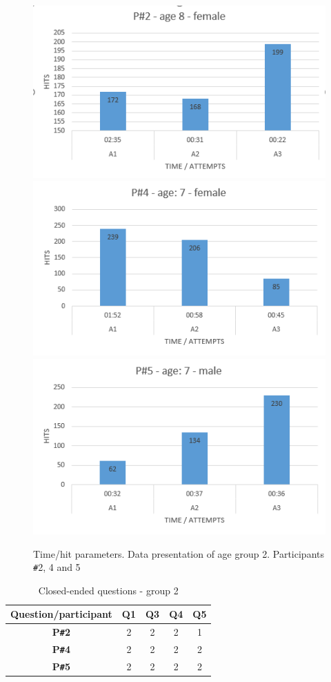 \begin{figure}[!ht]
    \centering
    \includegraphics[width=.6\textwidth]{figures/p2.png}
    \includegraphics[width=.6\textwidth]{figures/p4.png}
        \includegraphics[width=.6\textwidth]{figures/p5.png}
    \caption{Time/hit parameters. Data presentation of age group 2. Participants \texttt{\#}2, 4 and 5}
    \label{fig:agegroup2}
\end{figure}

\begin{table}[!ht]
    \centering
    \begin{tabular}{c|c|c|c|c}
    \hline
    \multicolumn{1}{|c|}{\textbf{Question/participant}} &
    \multicolumn{1}{c|}{\textbf{Q1}} &
    \multicolumn{1}{c|}{\textbf{Q3}} &
    \multicolumn{1}{c|}{\textbf{Q4}} &
    \multicolumn{1}{c|}{\textbf{Q5}} \\ \hline
    \multicolumn{1}{|c|}{\textbf{P\texttt{\#}2}} &
    \multicolumn{1}{c|}{2} &
    \multicolumn{1}{c|}{2} &
    \multicolumn{1}{c|}{2} &
    \multicolumn{1}{c|}{1} \\ \hline
    \multicolumn{1}{|c|}{\textbf{P\texttt{\#}4}} &
    \multicolumn{1}{c|}{2} &
    \multicolumn{1}{c|}{2} &
    \multicolumn{1}{c|}{2} &
    \multicolumn{1}{c|}{2} \\ \hline
    \multicolumn{1}{|c|}{\textbf{P\texttt{\#}5}} &
    \multicolumn{1}{c|}{2} &
    \multicolumn{1}{c|}{2} &
    \multicolumn{1}{c|}{2} &
    \multicolumn{1}{c|}{2} \\ \hline
    \end{tabular}
    \caption{Closed-ended questions - group 2}
    \label{tab:closedendenquestiongroup2}
\end{table}

